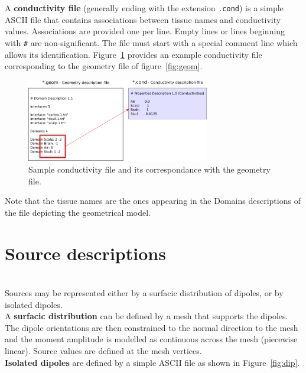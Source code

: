 \documentclass[10pt,journal]{book}
\newcommand{\example}[1]{\framebox[0.95\linewidth][l]{\parbox[t]{.93\linewidth}{\ttfamily \tiny #1}}}
\begin{document}
\medskip
    A {\bf conductivity file} (generally ending with the extension {\tt .cond}) is a simple ASCII file that contains associations between tissue names and
    conductivity values. Associations are provided one per line. Empty lines or lines beginning with {\tt \#} are non-significant. The file must start
    with a special comment line which allows its identification. Figure~\ref{fig:cond} provides an example conductivity file corresponding to the geometry file of figure~\ref{fig:geom}.
    \begin{figure}
        \center
        \includegraphics[width=8cm]{cond.png}
        \caption{Sample conductivity file and its correspondance with the geometry file.}
    \label{fig:cond}
    \end{figure}

    \medskip

    \noindent
    Note that the tissue names are the ones appearing in the Domains descriptions of the file depicting the geometrical model.

    \section{Source descriptions}\mbox{ }\\
    Sources may be represented either by a surfacic distribution of dipoles, or by isolated dipoles.\\
    A {\bf surfacic distribution} can be defined by a mesh that supports the dipoles. The dipole orientations are then constrained to the normal direction to the mesh and the moment amplitude is modelled as continuous across the mesh (piecewise linear). Source values are defined at the mesh vertices.\\
    {\bf Isolated dipoles} are defined by a simple ASCII file as shown in Figure~\ref{fig:dip}.\\
\end{document}
